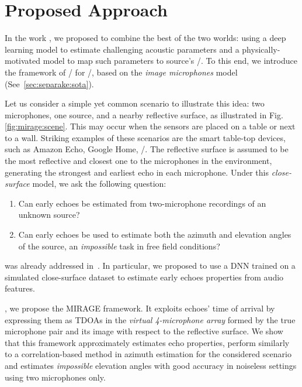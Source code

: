 \section{Proposed Approach}
In the work \cite{di2019mirage}, we proposed to combine the best of the two worlds:
using a deep learning model to estimate challenging acoustic parameters and a physically-motivated model to map such parameters to source's \DOAs/.
To this end, we introduce the framework of \MIRAGEdef/ for \SSL/, based on the \textit{image microphones} model~ (See~\cref{sec:separake:sota}).

\mynewline
Let us consider a simple yet common scenario to illustrate this idea:
two microphones, one source, and a nearby reflective surface, as illustrated in Fig. \cref{fig:mirage:scene}.
This may occur when the sensors are placed on a table or next to a wall. Striking examples of these scenarios are the smart table-top devices, such as Amazon Echo, Google Home, \etc/.
The reflective surface is assumed to be the most reflective and closest one to the microphones in the environment, generating the strongest and earliest echo in each microphone.
Under this \textit{close-surface} model, we ask the following question:
\begin{enumerate}
    \item Can early echoes be estimated from two-microphone recordings of an unknown source?
    \item Can early echoes be used to estimate both the azimuth and elevation angles of the source, an \textit{impossible} task in free field conditions?
\end{enumerate}

 was already addressed in~.
In particular, we proposed to use a \ac{DNN} trained on a simulated close-surface dataset to estimate early echoes properties from audio features.

, we propose the \ac{MIRAGE} framework.
It exploits echoes' time of arrival by expressing them as \acp{TDOA} in the \textit{virtual 4-microphone array} formed by the true microphone pair and its image with respect to the reflective surface.
We show that this framework approximately estimates echo properties, perform similarly to a correlation-based method in azimuth estimation for the considered
scenario and estimates \textit{impossible} elevation angles with good accuracy in noiseless settings using two microphones only.




